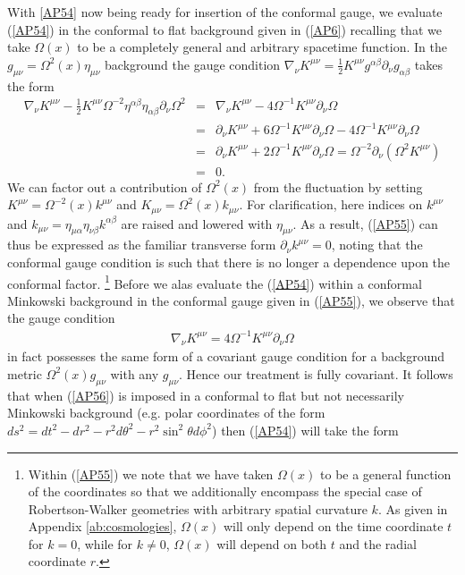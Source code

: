 With \eqref{AP54} now being ready for insertion of the conformal gauge, we evaluate (\ref{AP54}) in the conformal to flat background given in (\ref{AP6}) recalling that we take $\Omega(x)$ to be a completely general and arbitrary spacetime function. In the  $g_{\mu\nu}=\Omega^2(x)\eta_{\mu\nu}$ background  the gauge condition $\nabla_{\nu}K^{\mu\nu}=\frac{1}{2}K^{\mu\nu}g^{\alpha\beta}\partial_{\nu}g_{\alpha\beta}$ takes the form
%
\begin{eqnarray}
\nabla_{\nu}K^{\mu\nu}-\frac{1}{2}K^{\mu\nu}\Omega^{-2}\eta^{\alpha\beta}\eta_{\alpha\beta}\partial_{\nu}\Omega^2&=&\nabla_{\nu}K^{\mu\nu}-4\Omega^{-1}K^{\mu\nu}\partial_{\nu}\Omega 
\nonumber\\
&=&\partial_{\nu}K^{\mu\nu}+6\Omega^{-1}K^{\mu\nu}\partial_{\nu}\Omega-4\Omega^{-1}K^{\mu\nu}\partial_{\nu}\Omega
\nonumber\\
&=&\partial_{\nu}K^{\mu\nu}+2\Omega^{-1}K^{\mu\nu}\partial_{\nu}\Omega=\Omega^{-2}\partial_{\nu}(\Omega^{2}K^{\mu\nu}) 
\nonumber\\
&=&0. 
\label{AP55}
\end{eqnarray}
%
We can factor out a contribution of $\Omega^2(x)$ from the fluctuation by setting $K^{\mu\nu}=\Omega^{-2}(x)k^{\mu\nu}$ and $K_{\mu\nu}=\Omega^{2}(x)k_{\mu\nu}$. For clarification, here indices on $k^{\mu\nu}$ and $k_{\mu\nu}=\eta_{\mu\alpha}\eta_{\nu\beta}k^{\alpha\beta}$ are raised and lowered with $\eta_{\mu\nu}$. As a result, (\ref{AP55}) can thus be expressed as the familiar transverse form $\partial_{\nu}k^{\mu\nu}=0$, noting that the conformal gauge condition is such that there is no longer a dependence upon the conformal factor. 
	\footnote{Within (\ref{AP55}) we note that we have taken $\Omega(x)$ to be a general function of the coordinates so that we additionally encompass the special case of Robertson-Walker geometries with arbitrary spatial curvature $k$. As given in Appendix \ref{ab:cosmologies}, $\Omega(x)$ will only depend on the time coordinate $t$ for $k=0$, while for $k\ne 0$, $\Omega(x)$ will depend on both $t$ and the radial coordinate $r$.}
Before we alas evaluate the (\ref{AP54}) within a conformal Minkowski background in the conformal gauge given in (\ref{AP55}), we observe that the gauge condition 
%
\begin{eqnarray}
\nabla_{\nu}K^{\mu\nu}=4\Omega^{-1}K^{\mu\nu}\partial_{\nu}\Omega
\label{AP56}
\end{eqnarray}
% 
in fact possesses the same form of a covariant gauge condition for a background metric $\Omega^2(x) g_{\mu\nu}$ with any $g_{\mu\nu}$. Hence our treatment is fully covariant. It follows that when (\ref{AP56}) is imposed in a conformal to flat but not necessarily Minkowski background (e.g. polar coordinates of the form $ds^2=dt^2-dr^2-r^2d\theta^2-r^2\sin^2\theta d\phi^2$) then (\ref{AP54}) will take the form
